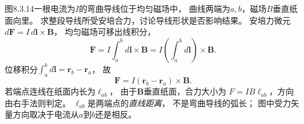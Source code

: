 \problemtext 图8.3.14一根电流为$I$的弯曲导线位于均匀磁场中，
曲线两端为$a,b$，磁场$B$垂直纸面向里。
求整段导线所受安培合力，讨论导线形状是否影响结果。
\workings
安培力微元$d\bm F=I\,d\bm l\times\bm B$，
均匀磁场可移出线积分，
\[
\bm F=I\int_a^b d\bm l\times\bm B
=I\left(\int_a^b d\bm l\right)\times\bm B.
\]
位移积分$\int_a^b d\bm l=\bm r_b-\bm r_a$，
故
\[
\boxed{\bm F=I(\bm r_b-\bm r_a)\times\bm B}.
\]
若端点连线在纸面内长为$\ell_{ab}$，
由于$\bm B$垂直纸面，合力大小为
$\boxed{F=IB\ell_{ab}}$，方向由右手法则判定。
\crosscheck $\ell_{ab}$是两端点的\emph{直线距离}，
不是弯曲导线的弧长；
图中受力矢量方向取决于电流从$a$到$b$还是相反。
